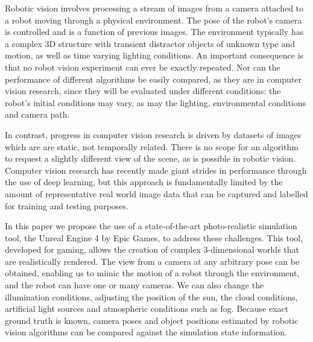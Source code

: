 Robotic vision involves processing a stream of images from a camera attached to a robot moving through a physical environment.
The pose of the robot's camera is controlled and is a function of previous images.  The environment typically has a complex 3D structure with transient 
distractor objects of unknown type and motion, as well as time varying lighting conditions.
An important consequence is that no robot vision experiment can ever be exactly repeated.
Nor can the performance of different algorithms be easily compared, as they are in computer vision research, since they will be evaluated under different conditions: the robot's initial conditions may vary, as may the lighting, environmental conditions and camera path.

In contrast,  progress in computer vision research is driven by datasets of images which are are static, not temporally related. There is no scope for an algorithm to
request a slightly different view of the scene, as is possible in robotic vision.
Computer vision research has recently made giant strides in performance through the use of deep learning, but this approach is fundamentally limited by the amount of representative real world image data that can be captured and labelled for training and testing purposes. 

In this paper we propose the use of a state-of-the-art photo-realistic simulation tool, the Unreal Engine 4 by Epic Games, to address these challenges.
This tool, developed for gaming,  allows the creation of complex 3-dimensional worlds that are realistically rendered.  The  view from a camera at any arbitrary pose can be obtained, enabling us to mimic the motion of a robot through the environment, and the robot can have one or many cameras. We can also change the illumination conditions, adjusting the position of the sun, the cloud conditions, artificial light sources and atmospheric conditions such as fog. Because exact ground truth is known, camera poses and object positions estimated by robotic vision algorithms can be compared against the simulation state information. 

